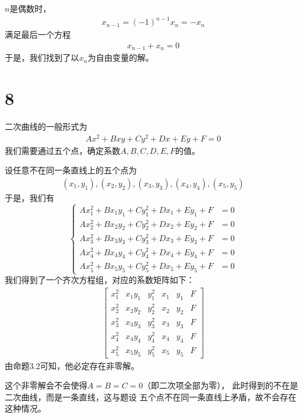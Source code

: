 \documentclass{article}
\begin{document}
$n$是偶数时，
\begin{align*}
  x_{n - 1} = (-1)^{n - 1} x_n = -x_n
\end{align*}
满足最后一个方程
\begin{align*}
  x_{n - 1} + x_n = 0
\end{align*}
于是，我们找到了以$x_n$为自由变量的解。

\section*{8}

二次曲线的一般形式为
\begin{align*}
  Ax^2 + Bxy + Cy^2 + Dx + Ey + F = 0
\end{align*}
我们需要通过五个点，确定系数$A,B,C,D,E,F$的值。

设任意不在同一条直线上的五个点为
\begin{align*}
  (x_1, y_1), (x_2, y_2), (x_3, y_3), (x_4, y_4), (x_5, y_5)
\end{align*}
于是，我们有
\begin{equation*}
  \begin{cases*}
    Ax_1^2 + Bx_1y_1 + Cy_1^2 + Dx_1 + Ey_1 + F & = 0 \\
    Ax_2^2 + Bx_2y_2 + Cy_2^2 + Dx_2 + Ey_2 + F & = 0 \\
    Ax_3^2 + Bx_3y_3 + Cy_3^2 + Dx_3 + Ey_3 + F & = 0 \\
    Ax_4^2 + Bx_4y_4 + Cy_4^2 + Dx_4 + Ey_4 + F & = 0 \\
    Ax_5^2 + Bx_5y_5 + Cy_5^2 + Dx_5 + Ey_5 + F & = 0
  \end{cases*}
\end{equation*}
我们得到了一个齐次方程组，对应的系数矩阵如下：
\begin{align*}
  \begin{bmatrix}
    x_1^2 & x_1y_1 & y_1^2 & x_1 & y_1 & F \\
    x_2^2 & x_2y_2 & y_2^2 & x_2 & y_2 & F \\
    x_3^2 & x_3y_3 & y_3^2 & x_3 & y_3 & F \\
    x_4^2 & x_4y_4 & y_4^2 & x_4 & y_4 & F \\
    x_5^2 & x_5y_5 & y_5^2 & x_5 & y_5 & F
  \end{bmatrix}
\end{align*}
由命题3.2可知，他必定存在非零解。

这个非零解会不会使得$A=B=C=0$（即二次项全部为零），
此时得到的不在是二次曲线，而是一条直线，这与题设
五个点不在同一条直线上矛盾，故不会存在这种情况。
\end{document}
